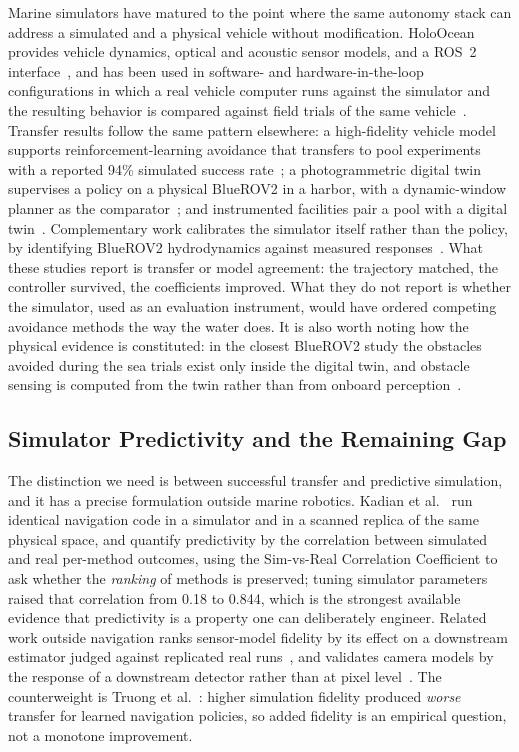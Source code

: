 Marine simulators have matured to the point where the same autonomy stack can
address a simulated and a physical vehicle without modification. HoloOcean
provides vehicle dynamics, optical and acoustic sensor models, and a ROS~2
interface~\cite{potokar2022holoocea,potokar2024holoocea,romrell2025apreview},
and has been used in software- and hardware-in-the-loop configurations in
which a real vehicle computer runs against the simulator and the resulting
behavior is compared against field trials of the same
vehicle~\cite{meyers2025testinga}. Transfer results follow the same pattern
elsewhere: a high-fidelity vehicle model supports reinforcement-learning
avoidance that transfers to pool experiments with a reported 94\% simulated
success rate~\cite{zhang2025simtoreal}; a photogrammetric digital twin
supervises a policy on a physical BlueROV2 in a harbor, with a dynamic-window
planner as the comparator~\cite{mari2026deeprein,mari2025digitalt}; and
instrumented facilities pair a pool with a digital
twin~\cite{torroba2026marinari,buche2026lotusimm}. Complementary work
calibrates the simulator itself rather than the policy, by identifying
BlueROV2 hydrodynamics against measured
responses~\cite{benzon2022anopenso,orjales2025towardsa}. What these studies
report is transfer or model agreement: the trajectory matched, the controller
survived, the coefficients improved. What they do not report is whether the
simulator, used as an evaluation instrument, would have ordered competing
avoidance methods the way the water does. It is also worth noting how the
physical evidence is constituted: in the closest BlueROV2 study the obstacles
avoided during the sea trials exist only inside the digital twin, and
obstacle sensing is computed from the twin rather than from onboard
perception~\cite{mari2026deeprein}.

\subsection{Simulator Predictivity and the Remaining Gap}

The distinction we need is between successful transfer and predictive
simulation, and it has a precise formulation outside marine robotics. Kadian
et al.~\cite{kadian2020simrealp} run identical navigation code in a simulator
and in a scanned replica of the same physical space, and quantify predictivity
by the correlation between simulated and real per-method outcomes, using the
Sim-vs-Real Correlation Coefficient to ask whether the \emph{ranking} of
methods is preserved; tuning simulator parameters raised that correlation
from 0.18 to 0.844, which is the strongest available evidence that
predictivity is a property one can deliberately engineer. Related work
outside navigation ranks sensor-model fidelity by its effect on a downstream
estimator judged against replicated real
runs~\cite{mahajan2024quantify}, and validates camera models by the response
of a downstream detector rather than at pixel
level~\cite{elmquist2022aperform}. The counterweight is
Truong et al.~\cite{truong2022rethinki}: higher simulation fidelity produced
\emph{worse} transfer for learned navigation policies, so added fidelity is
an empirical question, not a monotone improvement.

